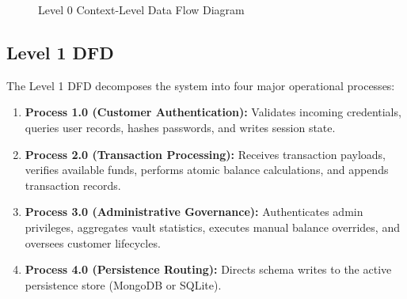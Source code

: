 \begin{figure}[htbp]
\centering
{}
\caption{Level 0 Context-Level Data Flow Diagram}
\label{fig:dfd0}
\end{figure}

\subsection{Level 1 DFD}
The Level 1 DFD decomposes the system into four major operational processes:
\begin{enumerate}
    \item \textbf{Process 1.0 (Customer Authentication):} Validates incoming credentials, queries user records, hashes passwords, and writes session state.
    \item \textbf{Process 2.0 (Transaction Processing):} Receives transaction payloads, verifies available funds, performs atomic balance calculations, and appends transaction records.
    \item \textbf{Process 3.0 (Administrative Governance):} Authenticates admin privileges, aggregates vault statistics, executes manual balance overrides, and oversees customer lifecycles.
    \item \textbf{Process 4.0 (Persistence Routing):} Directs schema writes to the active persistence store (MongoDB or SQLite).
\end{enumerate}

